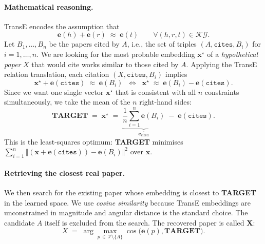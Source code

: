 \documentclass{article}
\begin{document}
\paragraph{Mathematical reasoning.}
TransE encodes the assumption that
\begin{equation}
    \mathbf{e}(h) + \mathbf{e}(r) \;\approx\; \mathbf{e}(t)
    \qquad \forall (h,r,t) \in \mathcal{KG}.
\end{equation}
Let $B_1,\dots,B_n$ be the papers cited by $A$, i.e., the set of triples
$(A, \texttt{cites}, B_i)$ for $i=1,\dots,n$. We are looking for the most
probable embedding $\mathbf{x}^\star$ of a \emph{hypothetical paper} $X$ that
would cite works similar to those cited by $A$. Applying the TransE
relation translation, each citation $(X, \texttt{cites}, B_i)$ implies
\begin{equation}
    \mathbf{x}^\star + \mathbf{e}(\texttt{cites}) \;\approx\; \mathbf{e}(B_i)
    \;\;\Longleftrightarrow\;\;
    \mathbf{x}^\star \;\approx\; \mathbf{e}(B_i) - \mathbf{e}(\texttt{cites}).
\end{equation}
Since we want one single vector $\mathbf{x}^\star$ that is consistent with all
$n$ constraints simultaneously, we take the mean of the $n$ right-hand sides:
\begin{equation}
    \boxed{\;
    \mathbf{TARGET} \;=\; \mathbf{x}^\star
    \;=\;
    \underbrace{\frac{1}{n}\sum_{i=1}^n \mathbf{e}(B_i)}_{\textstyle \overline{\mathbf{e}_\text{cited}}}
    \;-\; \mathbf{e}(\texttt{cites}).
    \;}
\end{equation}
This is the least-squares optimum: \textbf{TARGET} minimises
$\sum_{i=1}^{n}\Vert (\mathbf{x}+\mathbf{e}(\texttt{cites})) -
\mathbf{e}(B_i)\Vert^{2}$ over $\mathbf{x}$.

\paragraph{Retrieving the closest real paper.}
We then search for the existing paper whose embedding is closest to
\textbf{TARGET} in the learned space. We use \emph{cosine similarity} because
TransE embeddings are unconstrained in magnitude and angular distance is the
standard choice. The candidate $A$ itself is excluded from the search. The
recovered paper is called \textbf{X}:
\begin{equation}
    X \;=\; \arg\!\max_{p \,\in\, \mathcal{V} \setminus \{A\}}
    \cos\!\big(\mathbf{e}(p), \mathbf{TARGET}\big).
\end{equation}
\end{document}
